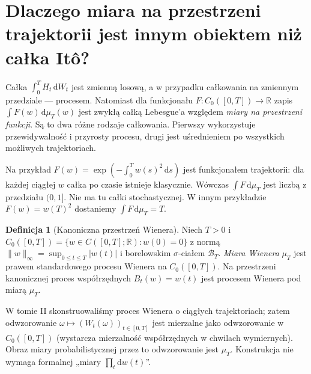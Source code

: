 \documentclass[11pt,a4paper,oneside]{report}
\numberwithin{equation}{chapter}
\theoremstyle{plain}
\theoremstyle{definition}
\newtheorem{definicja}{Definicja}[chapter]
\theoremstyle{remark}
\newcommand{\R}{\mathbb{R}}
\newcommand{\dd}{\mathrm{d}}
\begin{document}
\section{Dlaczego miara na przestrzeni trajektorii jest innym obiektem niż całka Itô?}

Całka $\int_0^T H_t\,\dd W_t$ jest zmienną losową, a w przypadku
całkowania na zmiennym przedziale --- procesem. Natomiast dla funkcjonału
$F:C_0([0,T])\to\R$ zapis $\int F(w)\,\dd\mu_T(w)$ jest zwykłą całką
Lebesgue'a względem \emph{miary na przestrzeni funkcji}. Są to dwa
różne rodzaje całkowania. Pierwszy wykorzystuje przewidywalność i przyrosty
procesu, drugi jest uśrednieniem po wszystkich możliwych trajektoriach.

Na przykład $F(w)=\exp(-\int_0^T w(s)^2\,\dd s)$ jest funkcjonałem
trajektorii: dla każdej ciągłej $w$ całka po czasie istnieje klasycznie.
Wówczas $\int F\,\dd\mu_T$ jest liczbą z przedziału $(0,1]$.
Nie ma tu całki stochastycznej. W innym przykładzie
$F(w)=w(T)^2$ dostaniemy $\int F\,\dd\mu_T=T$.

\begin{definicja}[Kanoniczna przestrzeń Wienera]
\label{def:canonical-wiener}
Niech $T>0$ i
$C_0([0,T])=\{w\in C([0,T];\R):w(0)=0\}$ z normą
$\|w\|_\infty=\sup_{0\le t\le T}|w(t)|$ i
borelowskim $\sigma$-ciałem $\mathcal B_T$.
\emph{Miara Wienera} $\mu_T$ jest prawem standardowego procesu Wienera
na $C_0([0,T])$. Na przestrzeni kanonicznej proces współrzędnych
$B_t(w)=w(t)$ jest procesem Wienera pod miarą $\mu_T$.
\end{definicja}

W tomie II skonstruowaliśmy proces Wienera o ciągłych trajektoriach;
zatem odwzorowanie $\omega\mapsto(W_t(\omega))_{t\in[0,T]}$ jest
mierzalne jako odwzorowanie w $C_0([0,T])$ (wystarcza mierzalność
współrzędnych w chwilach wymiernych). Obraz miary probabilistycznej
przez to odwzorowanie jest $\mu_T$. Konstrukcja nie wymaga formalnej
„miary $\prod_t\dd w(t)$”.
\end{document}
